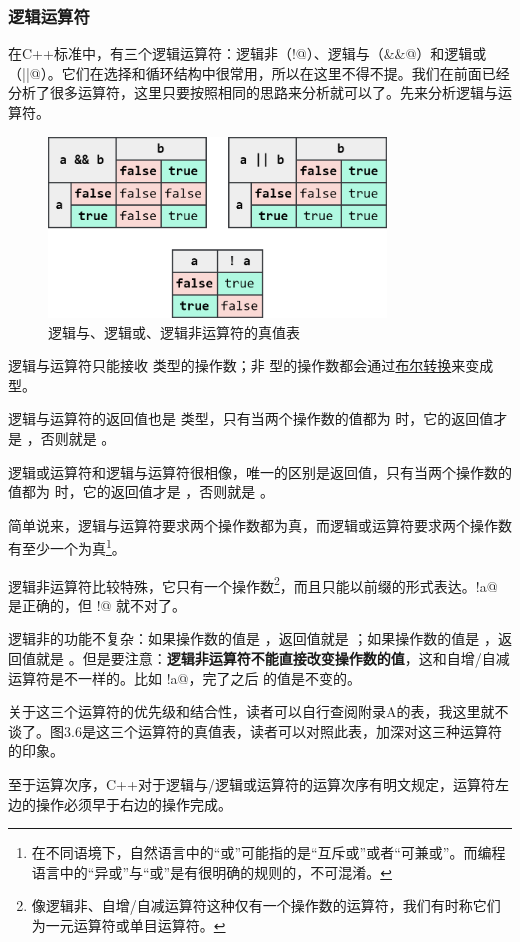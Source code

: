 \subsubsection*{逻辑运算符}
在C++标准中，有三个逻辑运算符：逻辑非（\lstinline@!@）、逻辑与（\lstinline@&&@）和逻辑或（\lstinline@||@）。它们在选择和循环结构中很常用，所以在这里不得不提。我们在前面已经分析了很多运算符，这里只要按照相同的思路来分析就可以了。先来分析逻辑与运算符。\par
\begin{figure}[htbp]
    \centering
    \includegraphics[width=0.8\textwidth]{../images/generalized_parts/03_truth_table_of_logic_operators_300.png}
    \caption{逻辑与、逻辑或、逻辑非运算符的真值表}
\end{figure}
逻辑与运算符只能接收 \lstinline@bool@ 类型的操作数；非 \lstinline@bool@ 型的操作数都会通过\hyperref[con:boolean_conversions]{布尔转换}来变成 \lstinline@bool@ 型。\par
逻辑与运算符的返回值也是 \lstinline@bool@ 类型，只有当两个操作数的值都为 \lstinline@true@ 时，它的返回值才是 \lstinline@true@，否则就是 \lstinline@false@。\par
逻辑或运算符和逻辑与运算符很相像，唯一的区别是返回值，只有当两个操作数的值都为 \lstinline@false@ 时，它的返回值才是 \lstinline@false@，否则就是 \lstinline@true@。\par
简单说来，逻辑与运算符要求两个操作数都为真，而逻辑或运算符要求两个操作数有至少一个为真\footnote{在不同语境下，自然语言中的``或''可能指的是``互斥或''或者``可兼或''。而编程语言中的``异或''与``或''是有很明确的规则的，不可混淆。}。\par
逻辑非运算符比较特殊，它只有一个操作数\footnote{像逻辑非、自增/自减运算符这种仅有一个操作数的运算符，我们有时称它们为一元运算符或单目运算符。}，而且只能以前缀的形式表达。\lstinline@!a@ 是正确的，但 \lstinline@a!@ 就不对了。\par
逻辑非的功能不复杂：如果操作数的值是 \lstinline@true@，返回值就是 \lstinline@false@；如果操作数的值是 \lstinline@false@，返回值就是 \lstinline@true@。但是要注意：\textbf{逻辑非运算符不能直接改变操作数的值}，这和自增/自减运算符是不一样的。比如 \lstinline@!a@，完了之后 \lstinline@a@ 的值是不变的。\par
关于这三个运算符的优先级和结合性，读者可以自行查阅附录A的表，我这里就不谈了。图3.6是这三个运算符的真值表，读者可以对照此表，加深对这三种运算符的印象。\par
至于运算次序，C++对于逻辑与/逻辑或运算符的运算次序有明文规定，运算符左边的操作必须早于右边的操作完成。\par

